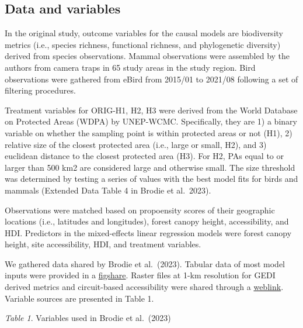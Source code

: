 \documentclass[
]{article}
\begin{document}
\hypertarget{data-and-variables}{%
\subsection{Data and variables}\label{data-and-variables}}

In the original study, outcome variables for the causal models are
biodiversity metrics (i.e., species richness, functional richness, and
phylogenetic diversity) derived from species observations. Mammal
observations were assembled by the authors from camera traps in 65 study
areas in the study region. Bird observations were gathered from eBird
from 2015/01 to 2021/08 following a set of filtering procedures.

Treatment variables for ORIG-H1, H2, H3 were derived from the World
Database on Protected Areas (WDPA) by UNEP-WCMC. Specifically, they are
1) a binary variable on whether the sampling point is within protected
areas or not (H1), 2) relative size of the closest protected area (i.e.,
large or small, H2), and 3) euclidean distance to the closest protected
area (H3). For H2, PAs equal to or larger than 500 km2 are considered
large and otherwise small. The size threshold was determined by testing
a series of values with the best model fits for birds and mammals
(Extended Data Table 4 in Brodie et al.~2023).

Observations were matched based on propoensity scores of their
geographic locations (i.e., latitudes and longitudes), forest canopy
height, accessibility, and HDI. Predictors in the mixed-effects linear
regression models were forest canopy height, site accessibility, HDI,
and treatment variables.

We gathered data shared by Brodie et al.~(2023). Tabular data of most
model inputs were provided in a
\href{https://doi.org/10.6084/m9.figshare.22527298.v1}{figshare}. Raster
files at 1-km resolution for GEDI derived metrics and circuit-based
accessibility were shared through a
\href{https://rcdata.nau.edu/geode_data/SEA_vertebrate_diversity_rasters}{weblink}.
Variable sources are presented in Table 1.

\emph{Table 1}. Variables used in Brodie et al.~(2023)
\end{document}
